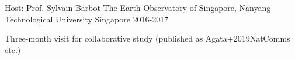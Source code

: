 


\begin{cventries}

  \cventry
    {Host: Prof. Sylvain Barbot} %
    {The Earth Observatory of Singapore, Nanyang Technological University} %
    {Singapore} %
    {2016-2017} %
    {
      \begin{cvitems} %
        \item {Three-month visit for collaborative study (published as Agata+2019NatComms etc.)}
      \end{cvitems}
    }


\end{cventries}
